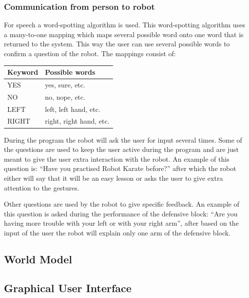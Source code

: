 \documentclass[10pt,a4paper,oneside]{scrartcl}
\begin{document}
\subsubsection{Communication from person to robot}
For speech a word-spotting algorithm is used.
This word-spotting algorithm uses a many-to-one mapping which maps several possible word onto one word that is returned to the system. 
This way the user can use several possible words to confirm a question of the robot. 
The mappings consist of: 
\begin{table}
  \begin{tabular}{|l|l|} \hline
    Keyword & Possible words           \\
    \hline 
    YES     & yes, sure, etc.          \\
    NO      & no, nope, etc.           \\
    LEFT    & left, left hand, etc.    \\
    RIGHT   & right, right hand, etc.  \\
    \hline
  \end{tabular}
\end{table}

During the program the robot will ask the user for input several times. 
Some of the questions are used to keep the user active during the program and are just meant to give the user extra interaction with the robot. 
An example of this question is: ``Have you practised Robot Karate before?'' after which the robot either will say that it will be an easy lesson or asks the user to give extra attention to the gestures. 

Other questions are used by the robot to give specific feedback.
An example of this question is asked during the performance of the defensive block: ``Are you having more trouble with your left or with your right arm'', after based on the input of the user the robot will explain only one arm of the defensive block. 



\subsection{World Model}

\subsection{Graphical User Interface}
\end{document}
